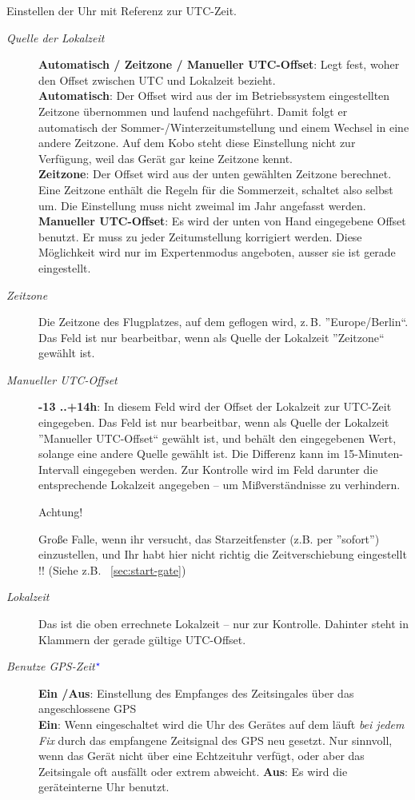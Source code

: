 Einstellen der Uhr mit Referenz zur UTC-Zeit.

\begin{description}
\item[\textit{Quelle der Lokalzeit}] {\bf Automatisch / Zeitzone / Manueller UTC-Offset}: Legt fest, woher \xc den Offset zwischen UTC und Lokalzeit bezieht.\\
{\bf Automatisch}: Der Offset wird aus der im Betriebssystem eingestellten Zeitzone übernommen und laufend nachgeführt. Damit folgt er automatisch der Sommer-/Winterzeitumstellung und einem Wechsel in eine andere Zeitzone. Auf dem Kobo steht diese Einstellung nicht zur Verfügung, weil das Gerät gar keine Zeitzone kennt.\\
{\bf Zeitzone}: Der Offset wird aus der unten gewählten Zeitzone berechnet. Eine Zeitzone enthält die Regeln für die Sommerzeit, \xc schaltet also selbst um. Die Einstellung muss nicht zweimal im Jahr angefasst werden.\\
{\bf Manueller UTC-Offset}: Es wird der unten von Hand eingegebene Offset benutzt. Er muss zu jeder Zeitumstellung korrigiert werden. Diese Möglichkeit wird nur im Expertenmodus angeboten, ausser sie ist gerade eingestellt.
\item[\textit{Zeitzone}] Die Zeitzone des Flugplatzes, auf dem geflogen wird, z.\,B. ''Europe/Berlin``. Das Feld ist nur bearbeitbar, wenn als Quelle der Lokalzeit ''Zeitzone`` gewählt ist.
\item[\textit{Manueller UTC-Offset}]  {\bf -13 ..+14h}: In diesem Feld wird der Offset der Lokalzeit zur UTC-Zeit eingegeben. Das Feld ist nur bearbeitbar, wenn als Quelle der Lokalzeit ''Manueller UTC-Offset`` gewählt ist, und behält den eingegebenen Wert, solange eine andere Quelle gewählt ist. Die Differenz kann im 15-Minuten-Intervall eingegeben werden.
Zur Kontrolle wird im Feld darunter die entsprechende Lokalzeit angegeben -- um Mißverständnisse zu verhindern.

Achtung! 

Große Falle, wenn ihr versucht, das Starzeitfenster (z.B. per ''sofort'') einzustellen, und Ihr habt \warning hier nicht richtig die Zeitverschiebung eingestellt !! (Siehe z.B. ~\ref{sec:start-gate})
\item[\textit{Lokalzeit}]  Das ist die oben errechnete Lokalzeit -- nur zur Kontrolle. Dahinter steht in Klammern der gerade gültige UTC-Offset.
\item[\textit{Benutze GPS-Zeit$^{\textcolor{blue}{\star}}$}] {\bf Ein /Aus}: Einstellung des Empfanges des Zeitsingales über das angeschlossene GPS\\
{\bf Ein}: Wenn eingeschaltet wird die Uhr des Gerätes auf dem \xc läuft \textsl{bei jedem Fix} durch das empfangene Zeitsignal des GPS neu gesetzt.
\achtung
Nur sinnvoll, wenn das Gerät nicht über eine Echtzeituhr verfügt, oder aber das Zeitsingale oft ausfällt oder extrem abweicht.
{\bf Aus}: Es wird die geräteinterne Uhr benutzt.
\end{description}


